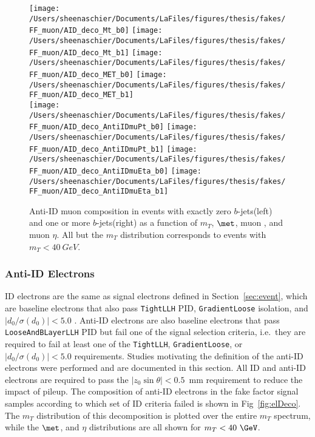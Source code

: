 \begin{figure}
        \centering
        \texttt{[image: /Users/sheenaschier/Documents/LaFiles/figures/thesis/fakes/FF\_muon/AID\_deco\_Mt\_b0]}
                \texttt{[image: /Users/sheenaschier/Documents/LaFiles/figures/thesis/fakes/FF\_muon/AID\_deco\_Mt\_b1]}
        \texttt{[image: /Users/sheenaschier/Documents/LaFiles/figures/thesis/fakes/FF\_muon/AID\_deco\_MET\_b0]}
        \texttt{[image: /Users/sheenaschier/Documents/LaFiles/figures/thesis/fakes/FF\_muon/AID\_deco\_MET\_b1]}\\
                \texttt{[image: /Users/sheenaschier/Documents/LaFiles/figures/thesis/fakes/FF\_muon/AID\_deco\_AntiIDmuPt\_b0]}
                        \texttt{[image: /Users/sheenaschier/Documents/LaFiles/figures/thesis/fakes/FF\_muon/AID\_deco\_AntiIDmuPt\_b1]}
        \texttt{[image: /Users/sheenaschier/Documents/LaFiles/figures/thesis/fakes/FF\_muon/AID\_deco\_AntiIDmuEta\_b0]}
        \texttt{[image: /Users/sheenaschier/Documents/LaFiles/figures/thesis/fakes/FF\_muon/AID\_deco\_AntiIDmuEta\_b1]}\\
        \caption{Anti-ID muon composition in events with exactly zero $b$-jets(left) and one or more $b$-jets(right) as a function of $m_{T}$, $\met$, muon \pt{}, and muon $\eta$. All but the $m_{T}$ distribution corresponds to events with $m_{T} < 40~GeV$.}
        \label{fig:muDeco}
\end{figure}


  \FloatBarrier

\subsubsection{Anti-ID Electrons}


ID electrons are the same as signal electrons defined in Section~\ref{sec:event}, which are baseline electrons that also pass \texttt{TightLLH} PID, \texttt{GradientLoose} isolation, and $|d_0/\sigma(d_0)|<5.0$ . Anti-ID electrons are also baseline electrons that pass \texttt{LooseAndBLayerLLH} PID but fail one of the signal selection criteria, i.e.~they are required to fail at least one of the \texttt{TightLLH}, \texttt{GradientLoose}, or $|d_0/\sigma(d_0)|<5.0$ requirements. Studies motivating the definition of the anti-ID electrons were performed and are documented in this section. All ID and anti-ID electrons are required to pass the $|z_0\sin\theta| < 0.5$~mm requirement to reduce the impact of pileup. The composition of anti-ID electrons in the fake factor signal samples according to which set of ID criteria failed is shown in Fig~\ref{fig:elDeco}. The $m_{T}$ distribution of this decomposition is plotted over the entire $m_{T}$ spectrum, while the $\met$, \pt{} and $\eta$ distributions are all shown for $m_{T} <40~\GeV$.


